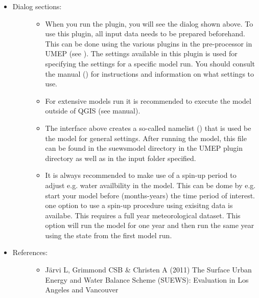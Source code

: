 \documentclass[letterpaper,10pt,english]{sphinxmanual}
\begin{document}
\begin{itemize}
\begin{description}
\end{description}

\item {} \begin{description}
\item[{Dialog sections:}] \leavevmode\begin{itemize}
\item {} 
When you run the plugin, you will see the dialog shown above. To use this plugin, all input data needs to be prepared beforehand. This can be done using the various plugins in the pre-processor in UMEP (see {\hyperref[\detokenize{Introduction:toolapplications}]{}}). The settings available in this plugin is used for specifying the settings for a specific model run. You should consult the manual () for instructions and information on what settings to use.

\item {} 
For extensive models run it is recommended to execute the model outside of QGIS (see manual).

\item {} 
The interface above creates a so-called namelist () that is used be the model for general settings. After running the model, this file can be found in the suewsmodel directory in the UMEP plugin directory as well as in the input folder specified.

\item {} 
It is always recommended to make use of a spin-up period to adjust e.g. water availbility in the model. This can be dome by e.g. start your model before (months-years) the time period of interest. one option to use a spin-up procedure using exisitng data is availabe. This requires a full year meteorological dataset. This option will run the model for one year and then run the same year using the state from the first model run.

\end{itemize}

\end{description}

\item {} \begin{description}
\item[{References:}] \leavevmode\begin{itemize}
\item {} 
Järvi L, Grimmond CSB \& Christen A (2011) The Surface Urban Energy and Water Balance Scheme (SUEWS): Evaluation in Los Angeles and Vancouver 


\end{itemize}
\end{description}
\end{itemize}
\end{document}
